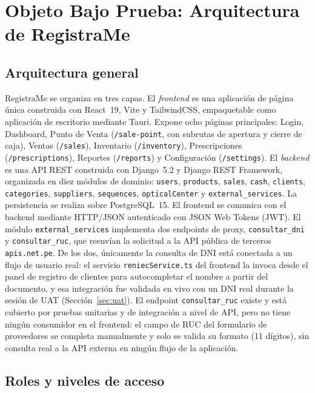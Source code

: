 \documentclass[conference]{IEEEtran}
\begin{document}
\section{Objeto Bajo Prueba: Arquitectura de RegistraMe}
\label{sec:architecture}

\subsection{Arquitectura general}

RegistraMe se organiza en tres capas. El \emph{frontend} es una aplicación de página única construida con React~19, Vite y TailwindCSS, empaquetable como aplicación de escritorio mediante Tauri. Expone ocho páginas principales: Login, Dashboard, Punto de Venta (\texttt{/sale-point}, con subrutas de apertura y cierre de caja), Ventas (\texttt{/sales}), Inventario (\texttt{/inventory}), Prescripciones (\texttt{/prescriptions}), Reportes (\texttt{/reports}) y Configuración (\texttt{/settings}). El \emph{backend} es una API REST construida con Django~5.2 y Django REST Framework, organizada en diez módulos de dominio: \texttt{users}, \texttt{products}, \texttt{sales}, \texttt{cash}, \texttt{clients}, \texttt{categories}, \texttt{suppliers}, \texttt{sequences}, \texttt{opticalCenter} y \texttt{external\_services}. La persistencia se realiza sobre PostgreSQL~15. El frontend se comunica con el backend mediante HTTP/JSON autenticado con JSON Web Tokens (JWT). El módulo \texttt{external\_services} implementa dos endpoints de proxy, \texttt{consultar\_dni} y \texttt{consultar\_ruc}, que reenvían la solicitud a la API pública de terceros \texttt{apis.net.pe}. De los dos, únicamente la consulta de DNI está conectada a un flujo de usuario real: el servicio \texttt{reniecService.ts} del frontend la invoca desde el panel de registro de clientes para autocompletar el nombre a partir del documento, y esa integración fue validada en vivo con un DNI real durante la sesión de UAT (Sección~\ref{sec:uat}). El endpoint \texttt{consultar\_ruc} existe y está cubierto por pruebas unitarias y de integración a nivel de API, pero no tiene ningún consumidor en el frontend: el campo de RUC del formulario de proveedores se completa manualmente y solo se valida su formato (11 dígitos), sin consulta real a la API externa en ningún flujo de la aplicación.

\subsection{Roles y niveles de acceso}
\end{document}
